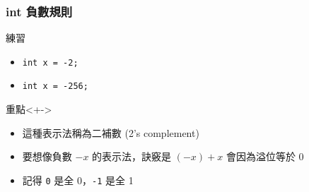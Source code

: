 \documentclass[utf8]{beamer}
\begin{document}
\begin{CJK}{UTF8}{bkai}
\begin{frame}[fragile]
  \frametitle{int 負數規則}
  \begin{exampleblock}{練習}
    \begin{itemize}[<+->]
    \item \lstinline{int x = -2;}{}
    \item \lstinline{int x = -256;}{}
    \end{itemize}
  \end{exampleblock}
  \begin{alertblock}{重點}<+->
    \begin{itemize}
    \item 這種表示法稱為\alert{二補數 (2's complement)}
    \item<+-> 要想像負數 $-x$ 的表示法，訣竅是 $(-x)+x$ 會因為溢位等於 0
    \item<+-> 記得 \lstinline{0}{} 是\alert{全 0}，\lstinline{-1}{} 是\alert{全 1}
    \end{itemize}
  \end{alertblock}
\end{frame}


\end{CJK}
\end{document}
